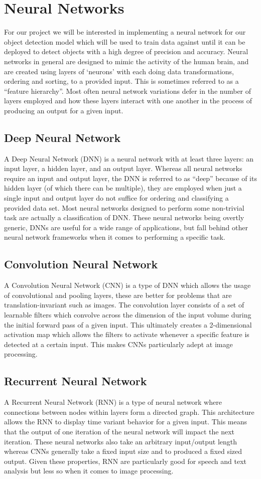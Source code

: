\documentclass[onecolumn, draftclsnofoot,10pt, compsoc]{IEEEtran}
\begin{document}
\section{Neural Networks}
For our project we will be interested in implementing a neural network for our object detection model which will be used to train data against until it can be deployed to detect objects with a high degree of precision and accuracy. Neural networks in general are designed to mimic the activity of the human brain, and are created using layers of ‘neurons’ with each doing data transformations, ordering and sorting, to a provided input. This is sometimes referred to as a “feature hierarchy”. Most often neural network variations defer in the number of layers employed and how these layers interact with one another in the process of producing an output for a given input.
\subsection{Deep Neural Network}
A Deep Neural Network (DNN) is a neural network with at least three layers: an input layer, a hidden layer, and an output layer. Whereas all neural networks require an input and output layer, the DNN is referred to as “deep” because of its hidden layer (of which there can be multiple), they are employed when just a single input and output layer do not suffice for ordering and classifying a provided data set\cite{NN}. Most neural networks designed to perform some non-trivial task are actually a classification of DNN. These neural networks being overtly generic, DNNs are useful for a wide range of applications, but fall behind other neural network frameworks when it comes to performing a specific task.
\subsection{Convolution Neural Network}
A Convolution Neural Network (CNN) is a type of DNN which allows the usage of convolutional and pooling layers, these are better for problems that are translation-invariant such as images. The convolution layer consists of a set of learnable filters which convolve across the dimension of the input volume during the initial forward pass of a given input\cite{NN}. This ultimately creates a 2-dimensional activation map which allows the filters to activate whenever a specific feature is detected at a certain input. This makes CNNs particularly adept at image processing.
\subsection{Recurrent Neural Network}
A Recurrent Neural Network (RNN) is a type of neural network where connections between nodes within layers form a directed graph. This architecture allows the RNN to display time variant behavior for a given input. This means that the output of one iteration of the neural network will impact the next iteration. These neural networks also take an arbitrary input/output length whereas CNNs generally take a fixed input size and to produced a fixed sized output\cite{NN}. Given these properties, RNN are particularly good for speech and text analysis but less so when it comes to image processing.
\end{document}
